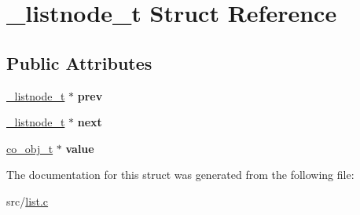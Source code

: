 \hypertarget{struct__listnode__t}{\section{\+\_\+listnode\+\_\+t Struct Reference}
\label{struct__listnode__t}
}
\subsection*{Public Attributes}
\begin{DoxyCompactItemize}
\item 
\hypertarget{struct__listnode__t_a5eba0591bc2c2dce2a29e15946efc748}{\hyperlink{struct__listnode__t}{\+\_\+listnode\+\_\+t} $\ast$ {\bfseries prev}}\label{struct__listnode__t_a5eba0591bc2c2dce2a29e15946efc748}

\item 
\hypertarget{struct__listnode__t_ae362dd930c62b55ac9efd3ae9c6e60cf}{\hyperlink{struct__listnode__t}{\+\_\+listnode\+\_\+t} $\ast$ {\bfseries next}}\label{struct__listnode__t_ae362dd930c62b55ac9efd3ae9c6e60cf}

\item 
\hypertarget{struct__listnode__t_a66185218b29346d0ad6c378d303ec54c}{\hyperlink{structco__obj__t}{co\+\_\+obj\+\_\+t} $\ast$ {\bfseries value}}\label{struct__listnode__t_a66185218b29346d0ad6c378d303ec54c}

\end{DoxyCompactItemize}


The documentation for this struct was generated from the following file\+:\begin{DoxyCompactItemize}
\item 
src/\hyperlink{list_8c}{list.\+c}\end{DoxyCompactItemize}
